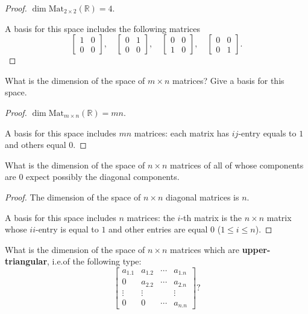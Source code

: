 \begin{proof}
    $\dim\text{Mat}_{2\times 2}(\mathbb{R}) = 4$.

    A basis for this space includes the following matrices
    \[
        \begin{bmatrix}
            1 & 0 \\
            0 & 0
        \end{bmatrix},\quad
        \begin{bmatrix}
            0 & 1 \\
            0 & 0
        \end{bmatrix},\quad
        \begin{bmatrix}
            0 & 0 \\
            1 & 0
        \end{bmatrix},\quad
        \begin{bmatrix}
            0 & 0 \\
            0 & 1
        \end{bmatrix}.
    \]
\end{proof}

\begin{exercise}
    What is the dimension of the space of $m\times n$ matrices? Give a basis for this space.
\end{exercise}

\begin{proof}
    $\dim\text{Mat}_{m\times n}(\mathbb{R}) = mn$.

    A basis for this space includes $mn$ matrices: each matrix has $ij$-entry equals to $1$ and others equal $0$.
\end{proof}

\begin{exercise}
    What is the dimension of the space of $n\times n$ matrices of all of whose components are $0$ expect possibly the diagonal components.
\end{exercise}

\begin{proof}
    The dimension of the space of $n\times n$ diagonal matrices is $n$.

    A basis for this space includes $n$ matrices: the $i$-th matrix is the $n\times n$ matrix whose $ii$-entry is equal to $1$ and other entries are equal $0$ ($1\le i\le n$).
\end{proof}

\begin{exercise}
    What is the dimension of the space of $n\times n$ matrices which are \textbf{upper-triangular}, i.e.\@ of the following type:
    \[
        \begin{bmatrix}
            a_{1.1} & a_{1.2} & \cdots & a_{1.n} \\
            0       & a_{2.2} & \cdots & a_{2.n} \\
            \vdots  & \vdots  &        & \vdots  \\
            0       & 0       & \cdots & a_{n.n}
        \end{bmatrix}?
    \]
\end{exercise}

